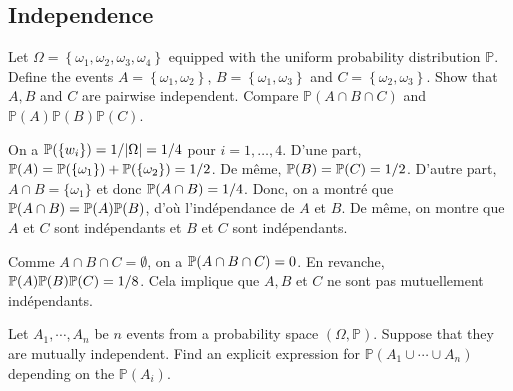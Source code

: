 \begin{center}
    \section*{Independence}
\end{center}

\begin{Exercise}[origin=Independent events]
     Let $\Omega=\left\{\omega_{1}, \omega_{2}, \omega_{3}, \omega_{4}\right\}$ equipped with the uniform probability distribution $\mathbb{P}$. Define the events $A=\left\{\omega_{1}, \omega_{2}\right\}$, $B=\left\{\omega_{1}, \omega_{3}\right\}$ and $C=\left\{\omega_{2}, \omega_{3}\right\}$. 
     Show that $A, B$ and $C$ are pairwise independent. Compare $\mathbb{P}(A \cap B \cap C)$ and $\mathbb{P}(A) \mathbb{P}(B) \mathbb{P}(C)$.
\end{Exercise}

\vspace{0.5cm}

\begin{solution}
On a $\mathbb{P}(\{w_i\})=1/|\Omega|=1/4$ pour $i=1,\dots,4$.
D'une part,   $\mathbb{P}(A)=\mathbb{P}(\{\omega_1\})+\mathbb{P}(\{\omega_2\})=1/2$. De même, $\mathbb{P}(B)=\mathbb{P}(C)=1/2$. D'autre part, $A\cap B=\{\omega_1\}$ et donc $\mathbb{P}(A\cap B)=1/4$. Donc, on a montr\'e que 
$\mathbb{P}(A\cap B)=\mathbb{P}(A)\mathbb{P}(B)$, d'où l'ind\'ependance de $A$ et $B$. De même, on montre que $A$ et $C$ sont ind\'ependants et $B$ et $C$ sont ind\'ependants.

Comme $A \cap B \cap C=\emptyset$, on a  $\mathbb{P}(A \cap B \cap C)=0$. En revanche, $\mathbb{P}(A) \mathbb{P}(B) \mathbb{P}(C)=1/8$. Cela implique que $A, B$ et $C$ ne sont pas mutuellement ind\'ependants.
\end{solution}

\begin{Exercise}
Let $A_1, \cdots , A_n$ be $n$ events from a probability space $(\Omega, \mathbb{P})$.
Suppose that they are mutually independent. Find an explicit expression for $\mathbb{P}(A_1 \cup \cdots \cup A_n)$ depending on the $\mathbb{P}(A_i)$.
\end{Exercise}

